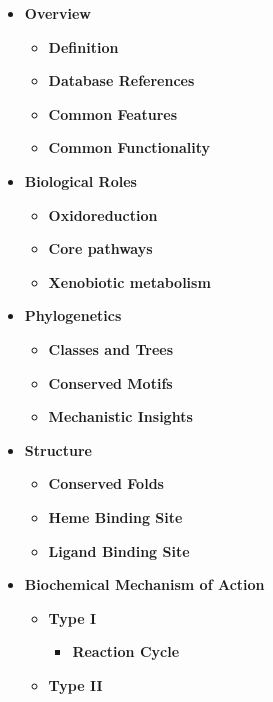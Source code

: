 \begin{itemize}
\tightlist
\item
  \textbf{Overview}

  \begin{itemize}
  \tightlist
  \item
    \textbf{Definition}
  \item
    \textbf{Database References}
  \item
    \textbf{Common Features}
  \item
    \textbf{Common Functionality}
  \end{itemize}
\item
  \textbf{Biological Roles}

  \begin{itemize}
  \tightlist
  \item
    \textbf{Oxidoreduction}
  \item
    \textbf{Core pathways}
  \item
    \textbf{Xenobiotic metabolism}
  \end{itemize}
\item
  \textbf{Phylogenetics}

  \begin{itemize}
  \tightlist
  \item
    \textbf{Classes and Trees}
  \item
    \textbf{Conserved Motifs}
  \item
    \textbf{Mechanistic Insights}
  \end{itemize}
\item
  \textbf{Structure}

  \begin{itemize}
  \tightlist
  \item
    \textbf{Conserved Folds}
  \item
    \textbf{Heme Binding Site}
  \item
    \textbf{Ligand Binding Site}
  \end{itemize}
\item
  \textbf{Biochemical Mechanism of Action}

  \begin{itemize}
  \tightlist
  \item
    \textbf{Type I}

    \begin{itemize}
    \tightlist
    \item
      \textbf{Reaction Cycle}
    \end{itemize}
  \item
    \textbf{Type II}


\end{itemize}
\end{itemize}
